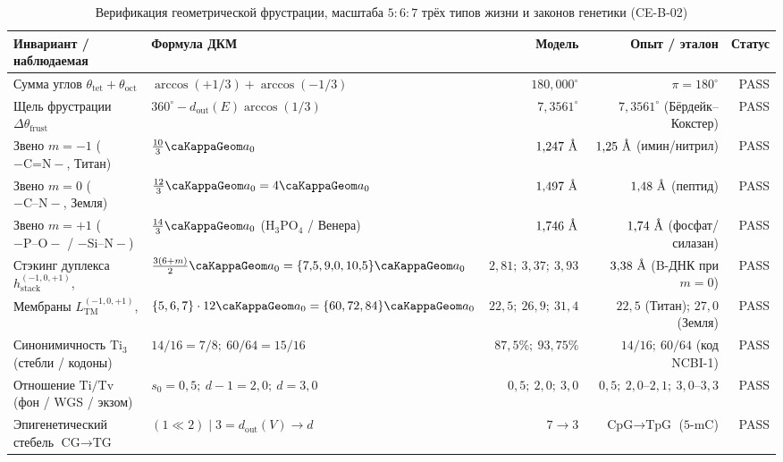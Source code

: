 \begin{table}[htbp]
\centering
\scriptsize
\setlength{\tabcolsep}{1.5pt}
\caption{Верификация геометрической фрустрации, масштаба $5:6:7$ трёх типов жизни и законов генетики (CE-B-02)}
\label{tab:exp-ce-b-02}
\begin{tabular}{@{}llrrr@{}}
\toprule
Инвариант / наблюдаемая & Формула ДКМ & Модель & Опыт / эталон & Статус \\
\midrule
Сумма углов $\theta_{\mathrm{tet}} + \theta_{\mathrm{oct}}$ & $\arccos(+1/3) + \arccos(-1/3)$ & $180{,}000^\circ$ & $\pi = 180^\circ$ & PASS \\
Щель фрустрации $\Delta\theta_{\mathrm{frust}}$ & $360^\circ - d_{\mathrm{out}}(E)\arccos(1/3)$ & $7{,}3561^\circ$ & $7{,}3561^\circ$ (Бёрдейк--Кокстер) & PASS \\
Звено $m=-1$ ($-\text{C{=}N}-$, Титан) & $\frac{10}{3}\caKappaGeom a_0$ & $1{,}247\ \text{\normalfont\AA}$ & $1{,}25\ \text{\normalfont\AA}$ (имин/нитрил) & PASS \\
Звено $m=0$ ($-\text{C--N}-$, Земля) & $\frac{12}{3}\caKappaGeom a_0 = 4\caKappaGeom a_0$ & $1{,}497\ \text{\normalfont\AA}$ & $1{,}48\ \text{\normalfont\AA}$ (пептид) & PASS \\
Звено $m=+1$ ($-\text{P--O}-$ / $-\text{Si--N}-$) & $\frac{14}{3}\caKappaGeom a_0$ ($\text{H}_3\text{PO}_4$ / Венера) & $1{,}746\ \text{\normalfont\AA}$ & $1{,}74\ \text{\normalfont\AA}$ (фосфат/силазан) & PASS \\
Стэкинг дуплекса $h_{\mathrm{stack}}^{(-1,0,+1)}$, \text{\normalfont\AA} & $\frac{3(6+m)}{2}\caKappaGeom a_0 = \{7{,}5,9{,}0,10{,}5\}\caKappaGeom a_0$ & $2{,}81;\ 3{,}37;\ 3{,}93$ & $3{,}38\ \text{\normalfont\AA}$ (B-ДНК при $m=0$) & PASS \\
Мембраны $L_{\mathrm{TM}}^{(-1,0,+1)}$, \text{\normalfont\AA} & $\{5,6,7\}\cdot 12\caKappaGeom a_0 = \{60,72,84\}\caKappaGeom a_0$ & $22{,}5;\ 26{,}9;\ 31{,}4$ & $22{,}5$ (Титан); $27{,}0$ (Земля) & PASS \\
Синонимичность $\mathrm{Ti}_3$ (стебли / кодоны) & $14/16 = 7/8;\ 60/64 = 15/16$ & $87{,}5\%;\ 93{,}75\%$ & $14/16;\ 60/64$ (код NCBI-1) & PASS \\
Отношение $\mathrm{Ti}/\mathrm{Tv}$ (фон / WGS / экзом) & $s_0 = 0{,}5;\ d-1 = 2{,}0;\ d = 3{,}0$ & $0{,}5;\ 2{,}0;\ 3{,}0$ & $0{,}5;\ 2{,}0\text{--}2{,}1;\ 3{,}0\text{--}3{,}3$ & PASS \\
Эпигенетический стебель $\text{CG}\to\text{TG}$ & $(1\ll 2)\mid 3 = d_{\mathrm{out}}(V) \to d$ & $7 \to 3$ & $\text{CpG}\to\text{TpG}$ ($5$-mC) & PASS \\

\end{tabular}
\end{table}
